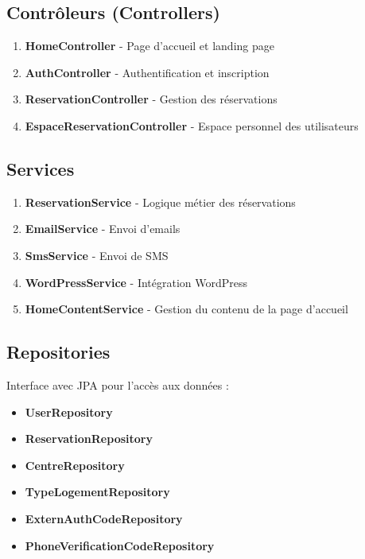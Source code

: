 \documentclass[12pt,a4paper]{article}
\begin{document}
\subsection{Contrôleurs (Controllers)}

\begin{enumerate}
    \item \textbf{HomeController} - Page d'accueil et landing page
    \item \textbf{AuthController} - Authentification et inscription
    \item \textbf{ReservationController} - Gestion des réservations
    \item \textbf{EspaceReservationController} - Espace personnel des utilisateurs
\end{enumerate}

\subsection{Services}

\begin{enumerate}
    \item \textbf{ReservationService} - Logique métier des réservations
    \item \textbf{EmailService} - Envoi d'emails
    \item \textbf{SmsService} - Envoi de SMS
    \item \textbf{WordPressService} - Intégration WordPress
    \item \textbf{HomeContentService} - Gestion du contenu de la page d'accueil
\end{enumerate}

\subsection{Repositories}

Interface avec JPA pour l'accès aux données :
\begin{itemize}
    \item \textbf{UserRepository}
    \item \textbf{ReservationRepository}
    \item \textbf{CentreRepository}
    \item \textbf{TypeLogementRepository}
    \item \textbf{ExternAuthCodeRepository}
    \item \textbf{PhoneVerificationCodeRepository}
\end{itemize}
\end{document}
